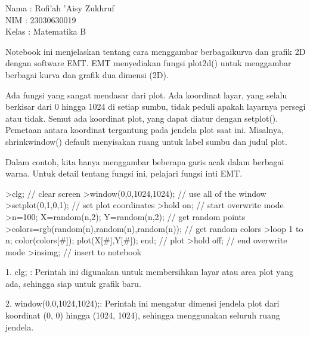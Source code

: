 \documentclass{article}
\begin{document}
\begin{eulernotebook}
\eulersubheading{}
\begin{eulercomment}
Nama   : Rofi'ah 'Aisy Zukhruf\\
NIM    : 23030630019\\
Kelas  : Matematika B\\
\end{eulercomment}
\eulersubheading{}
\begin{eulercomment}
\begin{eulercomment}
\begin{eulercomment}
Notebook ini menjelaskan tentang cara menggambar berbagaikurva dan
grafik 2D dengan software EMT. EMT menyediakan fungsi plot2d() untuk
menggambar berbagai kurva dan grafik dua dimensi (2D).

\end{eulercomment}
\begin{eulercomment}
Ada fungsi yang sangat mendasar dari plot. Ada koordinat layar, yang
selalu berkisar dari 0 hingga 1024 di setiap sumbu, tidak peduli
apakah layarnya persegi atau tidak. Semut ada koordinat plot, yang
dapat diatur dengan setplot(). Pemetaan antara koordinat tergantung
pada jendela plot saat ini. Misalnya, shrinkwindow() default
menyisakan ruang untuk label sumbu dan judul plot.

Dalam contoh, kita hanya menggambar beberapa garis acak dalam berbagai
warna. Untuk detail tentang fungsi ini, pelajari fungsi inti EMT.
\end{eulercomment}
\begin{eulerprompt}
>clg; // clear screen
>window(0,0,1024,1024); // use all of the window
>setplot(0,1,0,1); // set plot coordinates
>hold on; // start overwrite mode
>n=100; X=random(n,2); Y=random(n,2);  // get random points
>colors=rgb(random(n),random(n),random(n)); // get random colors
>loop 1 to n; color(colors[#]); plot(X[#],Y[#]); end; // plot
>hold off; // end overwrite mode
>insimg; // insert to notebook
\end{eulerprompt}
\begin{eulercomment}
1. clg; : Perintah ini digunakan untuk membersihkan layar atau area
plot yang ada, sehingga siap untuk grafik baru.

2. window(0,0,1024,1024);: Perintah ini mengatur dimensi jendela plot
dari koordinat (0, 0) hingga (1024, 1024), sehingga menggunakan
seluruh ruang jendela.


\end{eulercomment}
\end{eulercomment}
\end{eulercomment}
\end{eulernotebook}
\end{document}

